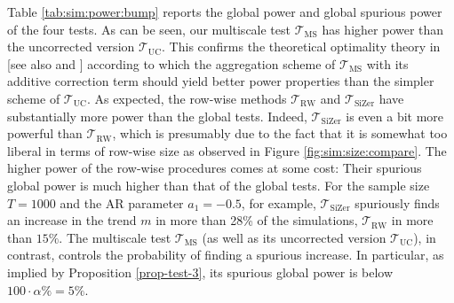 Table \ref{tab:sim:power:bump} reports the global power and global spurious power of the four tests. As can be seen, our multiscale test $\mathcal{T}_{\text{MS}}$ has higher power than the uncorrected version $\mathcal{T}_{\text{UC}}$. This confirms the theoretical optimality theory in \cite{DuembgenSpokoiny2001} [see also \cite{DuembgenWalther2008} and \cite{RufibachWalther2010}] according to which the aggregation scheme of $\mathcal{T}_{\text{MS}}$ with its additive correction term should yield better power properties than the simpler scheme of $\mathcal{T}_{\text{UC}}$. As expected, the row-wise methods $\mathcal{T}_{\text{RW}}$ and $\mathcal{T}_{\text{SiZer}}$ have substantially more power than the global tests. Indeed, $\mathcal{T}_{\text{SiZer}}$ is even a bit more powerful than $\mathcal{T}_{\text{RW}}$, which is presumably due to the fact that it is somewhat too liberal in terms of row-wise size as observed in Figure \ref{fig:sim:size:compare}. The higher power of the row-wise procedures comes at some cost: Their spurious global power is much higher than that of the global tests. For the sample size $T=1000$ and the AR parameter $a_1=-0.5$, for example, $\mathcal{T}_{\text{SiZer}}$ spuriously finds an increase in the trend $m$ in more than 28\% of the simulations, $\mathcal{T}_{\text{RW}}$ in more than $15\%$. 
The multiscale test $\mathcal{T}_{\text{MS}}$ (as well as its uncorrected version $\mathcal{T}_{\text{UC}}$), in contrast, controls the probability of finding a spurious increase. In particular, as implied by Proposition \ref{prop-test-3}, its spurious global power is below $100\cdot\alpha\% = 5\%$.  


